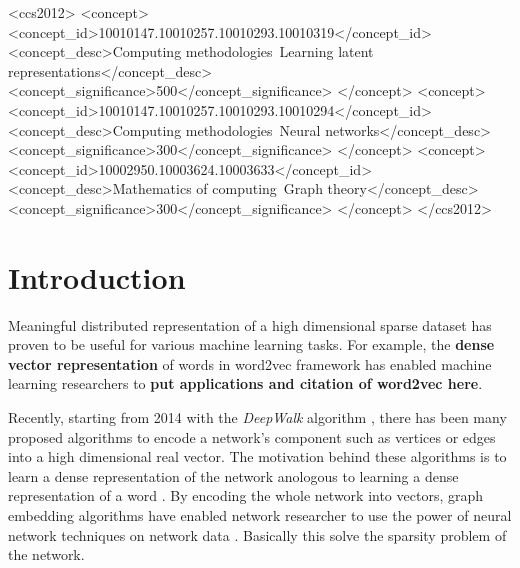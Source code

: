 \documentclass{sig-alternate-05-2015}
\begin{document}
%
%

\begin{CCSXML}
<ccs2012>
<concept>
<concept_id>10010147.10010257.10010293.10010319</concept_id>
<concept_desc>Computing methodologies~Learning latent representations</concept_desc>
<concept_significance>500</concept_significance>
</concept>
<concept>
<concept_id>10010147.10010257.10010293.10010294</concept_id>
<concept_desc>Computing methodologies~Neural networks</concept_desc>
<concept_significance>300</concept_significance>
</concept>
<concept>
<concept_id>10002950.10003624.10003633</concept_id>
<concept_desc>Mathematics of computing~Graph theory</concept_desc>
<concept_significance>300</concept_significance>
</concept>
</ccs2012>
\end{CCSXML}



%
%

%
%
\printccsdesc



\section{Introduction}

Meaningful distributed representation of a high dimensional sparse
dataset has proven to be useful for various machine learning tasks.
For example, the \textbf{dense vector representation} of words in 
word2vec framework \cite{w2v} has enabled machine learning
researchers to \textbf{put applications and citation of word2vec here}.

Recently, starting from 2014 with the \emph{DeepWalk} algorithm \cite{deepwalk},
there has been many proposed algorithms to encode a network's component such as
vertices or edges into a high dimensional real vector. The motivation behind
these algorithms is to learn a dense representation of the network anologous 
to learning a dense representation of a word \cite{w2v}. By encoding the 
whole network into vectors, graph embedding algorithms have
enabled network researcher to use the power of neural network techniques on
network data \cite{all_deep_learning_on_network}. Basically this solve the
sparsity problem of the network.
\end{document}
